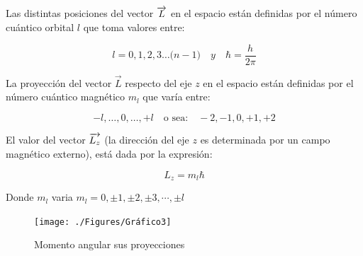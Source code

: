 %
%
%
%
%

Las distintas posiciones del vector $\overrightarrow{L}$ en el espacio están definidas por el número cuántico orbital $l$ que toma valores entre:

\begin{equation}
 l = 0, 1, 2, 3 \ldots\big(n-1\big) \quad y \quad \hbar = \frac{h}{2 \pi }
\end{equation}


La proyección del vector $\overrightarrow{\textit{L}}$ respecto del eje $z$ en el espacio están definidas por el número cuántico magnético $m_{l}$ que varía entre:

\begin{equation}
 -l,\ldots,0 ,\ldots, +l \quad \text{o sea:} \quad -2,-1,0,+1,+2
\end{equation}

El valor del vector $\overrightarrow{L_{z}}$ (la dirección del eje $z$ es determinada por un campo magnético externo), está dada por la expresión:

\begin{equation}
	L_{z}=m_{l}\hbar
\end{equation}

Donde $m_{l}$ varia $m_{l}=0, \pm 1, \pm 2, \pm 3, \cdots, \pm l$

\begin{figure}[H]
    \centering
    \texttt{[image: ./Figures/Gráfico3]}
	\caption{Momento angular sus proyecciones}
	\label{fig:Grafico3}
\end{figure}

